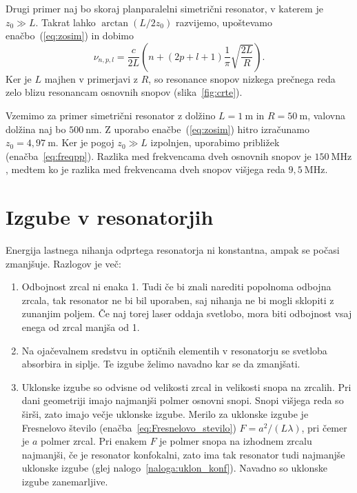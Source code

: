 Drugi primer naj bo skoraj planparalelni 
simetrični resonator, v katerem je $z_{0}\gg L$. Takrat lahko $\arctan(L/2z_{0})$ razvijemo, 
upoštevamo enačbo~(\ref{eq:zosim}) in dobimo
\begin{equation}
\nu_{n,p,l}=\frac{c}{2L}\left(n+(2p+l+1)\frac{1}{\pi}\sqrt{\frac{2L}{R}}\right)\!.
\label{eq:freqpp}
\end{equation}
Ker je $L$ majhen v primerjavi z $R$, so resonance snopov nizkega prečnega reda 
zelo blizu resonancam osnovnih snopov (slika~\ref{fig:crte}).

Vzemimo za primer
simetrični resonator z dolžino $L=1~\si{\metre}$ in $R=50~\si{\metre}$, 
valovna dolžina naj bo $500~\si{\nano\metre}$. Z uporabo enačbe~(\ref{eq:zosim})
hitro izračunamo $z_0 = 4,97~\si{\metre}$. Ker je pogoj $z_0\gg L$ izpolnjen,  uporabimo
približek (enačba~\ref{eq:freqpp}). Razlika med frekvencama dveh osnovnih snopov je 
$150~\si{\mega\hertz}$, medtem ko je razlika med frekvencama dveh snopov višjega reda
$9,5~\si{\mega\hertz}$.

\section{Izgube v resonatorjih}
Energija lastnega nihanja odprtega resonatorja ni konstantna, ampak se počasi
zmanjšuje. Razlogov je več:
\begin{enumerate}
\item Odbojnost zrcal ni enaka 1. Tudi če bi znali narediti popolnoma odbojna zrcala, 
tak resonator ne bi bil uporaben, saj nihanja ne bi mogli sklopiti z zunanjim poljem. Če 
naj torej laser oddaja svetlobo, mora biti odbojnost vsaj enega od zrcal manjša od 1.

\item Na ojačevalnem sredstvu in optičnih elementih v resonatorju se svetloba absorbira in siplje. Te izgube želimo navadno kar se da zmanjšati.

\item Uklonske izgube so odvisne od velikosti zrcal in velikosti snopa na zrcalih.
Pri dani geometriji imajo najmanjši polmer osnovni snopi. Snopi višjega
reda so širši, zato imajo večje uklonske izgube. Merilo za uklonske
izgube je Fresnelovo število (enačba~\ref{eq:Fresnelovo_stevilo}) 
$F=a^{2}/(L\lambda)$, pri čemer je $a$ polmer zrcal. Pri enakem $F$ je
polmer snopa na izhodnem zrcalu najmanjši, če je resonator konfokalni, 
zato ima tak resonator tudi najmanjše uklonske izgube (glej nalogo~\ref{naloga:uklon_konf}).
Navadno so uklonske izgube zanemarljive. 
\end{enumerate}


